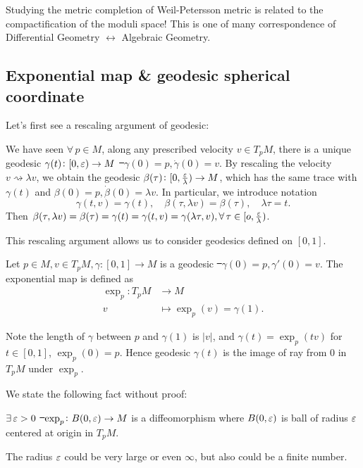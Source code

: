  Studying the metric completion of
Weil-Petersson metric is related to the compactification of the moduli space!
This is one of many correspondence of Differential Geometry \(\longleftrightarrow\)
Algebraic Geometry.

\subsection{Exponential map \& geodesic spherical coordinate}
Let's first see a rescaling argument of geodesic:

We have seen \(\forall\,p\in M\), along any prescribed velocity \(v\in T_p M\), there
is a unique geodesic \(\gamma(t)\colon [0,\varepsilon)\to M\) \st\ \(\gamma(0)=p,
\dot\gamma(0)=v\). By rescaling the velocity \(v\rightsquigarrow\lambda v\), we obtain
the geodesic \(\beta(\tau)\colon[0,\frac{\varepsilon}{\lambda})\to M\), which has the same
trace with \(\gamma(t)\) and \(\beta(0)=p,\dot\beta(0)=\lambda v\). In particular,
we introduce notation \[
    \gamma(t,v)=\gamma(t),\quad \beta(\tau,\lambda v)=\beta(\tau),\quad \lambda\tau=t
.\] Then \(\beta(\tau,\lambda v)=\beta(\tau)=\gamma(t)=\gamma(t,v)=\gamma(\lambda\tau,v
),\forall\,\tau\in [o,\frac{\varepsilon}{\lambda})\).

This rescaling argument allows us to consider geodesics defined on \([0,1]\).
\begin{definition}
    Let \(p\in M,v\in T_p M,\gamma\colon[0,1]\to M\) is a geodesic \st\ \(\gamma(0)=p,
    \gamma'(0)=v\). The exponential map is defined as
    \begin{align*}
        \exp_p\colon T_p M &\longrightarrow M \\
        v &\longmapsto \exp_p(v)=\gamma(1)
    .\end{align*}
\end{definition}
Note the length of \(\gamma\) between \(p\) and \(\gamma(1)\) is \(|v|\), and
\(\gamma(t)=\exp_p(tv)\) for \(t\in [0,1]\), \(\exp_p(0)=p\). Hence geodesic \(\gamma
(t)\) is the image of ray from \(0\) in \(T_p M\) under \(\exp_p\).

We state the following fact without proof:
\begin{prop}
    \(\exists\,\varepsilon>0\) \st\ \(\exp_p\colon B(0,\varepsilon)\to M\) is a diffeomorphism
    where \(B(0,\varepsilon)\) is ball of radius \(\varepsilon\) centered at origin in \(T_p M\).
\end{prop}
\begin{remark}
    The radius \(\varepsilon\) could be very large or even \(\infty\), but also could be
    a finite number.
\end{remark}

